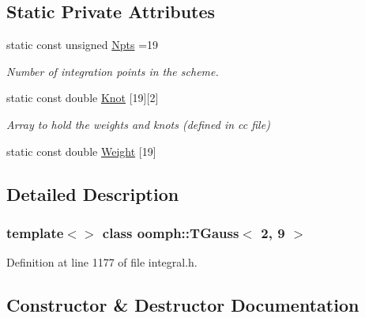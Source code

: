 \subsection*{Static Private Attributes}
\begin{DoxyCompactItemize}
\item 
static const unsigned \hyperlink{classoomph_1_1TGauss_3_012_00_019_01_4_adbb9f0ca0c71842bbb3bfb56e5e4ac91}{Npts} =19
\begin{DoxyCompactList}\small\item\em Number of integration points in the scheme. \end{DoxyCompactList}\item 
static const double \hyperlink{classoomph_1_1TGauss_3_012_00_019_01_4_a65f7297373f3c25ff0616fde13fb4d65}{Knot} \mbox{[}19\mbox{]}\mbox{[}2\mbox{]}
\begin{DoxyCompactList}\small\item\em Array to hold the weights and knots (defined in cc file) \end{DoxyCompactList}\item 
static const double \hyperlink{classoomph_1_1TGauss_3_012_00_019_01_4_a5bc109adedda0d2f97710811c46faf63}{Weight} \mbox{[}19\mbox{]}
\end{DoxyCompactItemize}


\subsection{Detailed Description}
\subsubsection*{template$<$$>$\newline
class oomph\+::\+T\+Gauss$<$ 2, 9 $>$}



Definition at line 1177 of file integral.\+h.



\subsection{Constructor \& Destructor Documentation}
\mbox{\label{classoomph_1_1TGauss_3_012_00_019_01_4_a17844fd0c402459aeec4ab9e962032c8}} 
